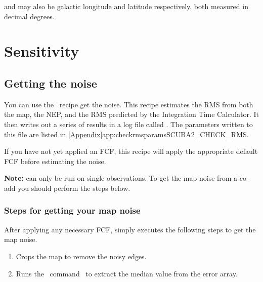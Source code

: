  and  may also be galactic
longitude and latitude respectively, both measured in decimal
degrees.

\section{Sensitivity}

\subsection{Getting the noise}
\label{sec:checkrms}

You can use the \picard\ recipe  get the
noise. This recipe estimates the RMS from both the map, the NEP, and
the RMS predicted by the Integration Time Calculator. It then writes out
a series of results in a log file called . The
parameters written to this file are listed in
\cref{Appendix}{app:checkrmsparams}{SCUBA2_CHECK_RMS}.

\begin{terminalv}
\end{terminalv}
If you have not yet applied an FCF, this recipe will apply the
appropriate default FCF before estimating the noise.


\textbf{Note:}  can only be run on single
observations. To get the map noise from a co-add you should perform the steps below.


\subsubsection*{Steps for getting your map noise}
After applying any necessary FCF,  simply
executes the following steps to get the map noise.

\begin{enumerate}
\item Crops the map to remove the noisy edges.
\begin{terminalv}
\end{terminalv}
\item Runs the \Kappa\ command \stats\ to extract the median value from
the error array.
\begin{terminalv}
\end{terminalv}
\end{enumerate}

